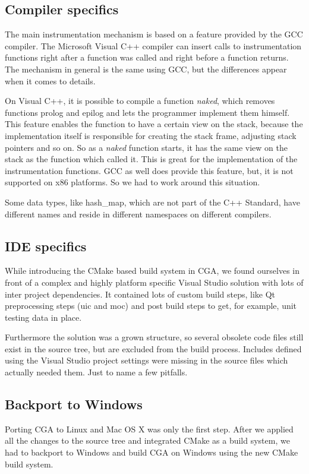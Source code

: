 \subsection{Compiler specifics} The main instrumentation mechanism is based on a feature provided by the GCC compiler.  The Microsoft Visual C++ compiler can insert calls to instrumentation functions right after a function was called and right before a function returns. The mechanism in general is the same using GCC, but the differences appear when it comes to details.

On Visual C++, it is possible to compile a function \emph{naked}, which removes functions prolog and epilog and lets the programmer implement them himself. This feature enables the function to have a certain view on the stack, because the implementation itself is responsible for creating the stack frame, adjusting stack pointers and so on. So as a \emph{naked} function starts, it has the same view on the stack as the function which called it. This is great for the implementation of the instrumentation functions. GCC as well does provide this feature, but, it is not supported on x86 platforms. So we had to work around this situation.

Some data types, like hash\_map, which are not part of the C++ Standard, have different names and reside in different namespaces on different compilers.

\subsection{IDE specifics} While introducing the CMake based build system in CGA, we found ourselves in front of a complex and highly platform specific Visual Studio solution with lots of inter project dependencies. It contained lots of custom build steps, like Qt preprocessing steps (uic and moc) and post build steps to get, for example, unit testing data in place.

Furthermore the solution was a grown structure, so several obsolete code files still exist in the source tree, but are excluded from the build process. Includes defined using the Visual Studio project settings were missing in the source files which actually needed them. Just to name a few pitfalls.

\subsection{Backport to Windows} Porting CGA to Linux and Mac OS X was only the first step. After we applied all the changes to the source tree and integrated CMake as a build system, we had to backport to Windows and build CGA on Windows using the new CMake build system.

